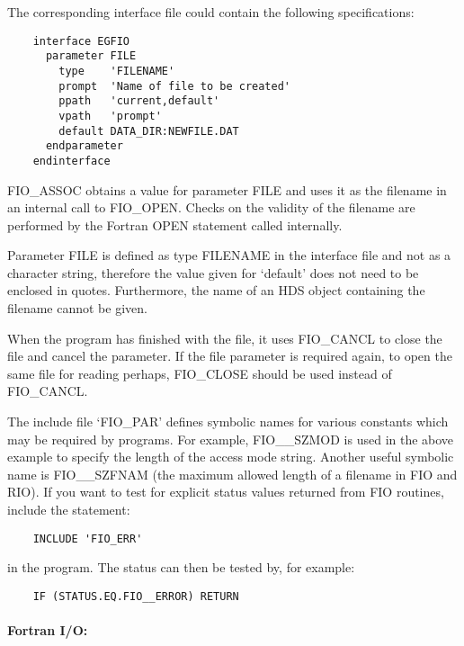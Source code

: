 The corresponding interface file could contain the following specifications:

\begin{small}
\begin{verbatim}
    interface EGFIO
      parameter FILE
        type    'FILENAME'
        prompt  'Name of file to be created'
        ppath   'current,default'
        vpath   'prompt'
        default DATA_DIR:NEWFILE.DAT
      endparameter
    endinterface
\end{verbatim}
\end{small}

FIO\_ASSOC obtains a value for parameter FILE and uses it as the filename in an
internal call to FIO\_OPEN.
Checks on the validity of the filename are performed by the Fortran OPEN
statement called internally.

Parameter FILE is defined as type FILENAME in the interface file and not as a
character string, therefore the value given for `default' does not need to be
enclosed in quotes.
Furthermore, the name of an HDS object containing the filename cannot be
given.

When the program has finished with the file, it uses FIO\_CANCL to close the
file and cancel the parameter.
If the file parameter is required again, to open the same file for reading
perhaps, FIO\_CLOSE should be used instead of FIO\_CANCL.

The include file `FIO\_PAR' defines symbolic names for various constants which
may be required by programs.
For example, FIO\_\_SZMOD is used in the above example to specify the length of
the access mode string.
Another useful symbolic name is FIO\_\_SZFNAM (the maximum allowed length of
a filename in FIO and RIO).
If you want to test for explicit status values returned from FIO routines,
include the statement:

\begin{small}
\begin{verbatim}
    INCLUDE 'FIO_ERR'
\end{verbatim}
\end{small}

in the program.
The status can then be tested by, for example:

\begin{small}
\begin{verbatim}
    IF (STATUS.EQ.FIO__ERROR) RETURN
\end{verbatim}
\end{small}

\paragraph{Fortran I/O:}\hfill

